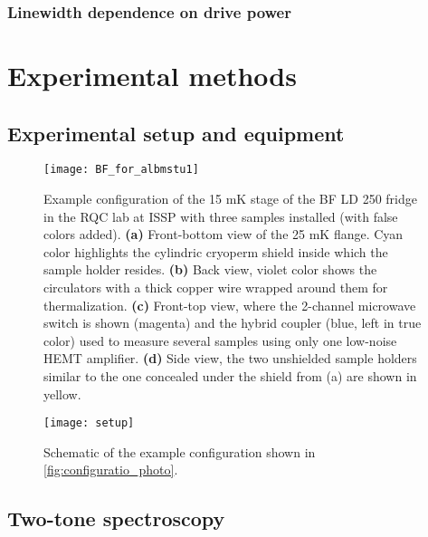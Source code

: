 \documentclass[12pt, twoside]{report}
\numberwithin{equation}{section}
\begin{document}
\subsection{Linewidth dependence on drive power} \label{subsec:linewidth}

\chapter{Experimental methods}

\section{Experimental setup and equipment}


\begin{figure}[h!]
\centering
\texttt{[image: BF\_for\_albmstu1]}
\caption{Example configuration of the 15 mK stage of the BF LD 250 fridge in the RQC lab at ISSP with three samples installed (with false colors added). \textbf{(a)} Front-bottom view of the 25 mK flange. Cyan color highlights the cylindric cryoperm shield inside which the sample holder resides. \textbf{(b)} Back view, violet color shows the circulators with  a thick copper wire wrapped around them for thermalization. \textbf{(c)} Front-top view, where the 2-channel  microwave switch is shown (magenta) and the hybrid coupler (blue, left in true color) used to measure several samples using only one low-noise HEMT amplifier. \textbf{(d)} Side view, the two unshielded sample holders similar to the one concealed under the shield from (a) are shown in yellow.}
\label{fig:configuratio_photo}
\end{figure}

\begin{figure}[h!]
\centering
\texttt{[image: setup]}
\caption{Schematic of the example configuration shown in \autoref{fig:configuratio_photo}.}
\end{figure}

\section{Two-tone spectroscopy}
\label{sec:2tone}
\end{document}
